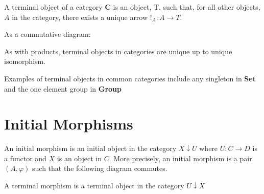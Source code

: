 \documentclass[a4paper,10pt]{article}
\begin{document}
A terminal object of a category \textbf{C} is an object, T, such that, for all
other objects, $A$ in the category, there exists a unique arrow $!_{A}: A
\rightarrow T$.

As a commutative diagram:


As with products, terminal objects in categories are unique up to unique
isomorphism.

Examples of terminal objects in common categories include any singleton in
\textbf{Set} and the one element group in \textbf{Group}
\section{Initial Morphisms}
An initial morphism is an initial object in the category $X \downarrow U$ where
$U : C \rightarrow D$ is a functor and $X$ is an object in $C$. More precisely,
an initial morphism is a pair $(A, \varphi)$ such that the following diagram
commutes.

A terminal morphism is a terminal object in the category $U \downarrow X$

\end{document}
